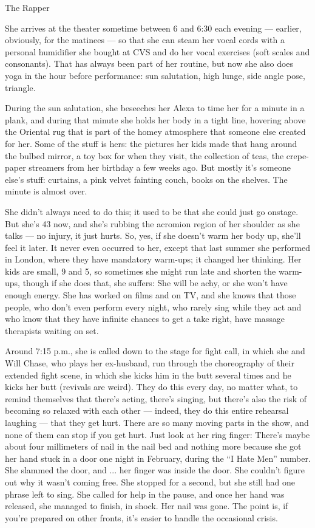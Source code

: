 \href{https://www.nytimes3xbfgragh.onion/interactive/2019/05/30/magazine/princess-nokia-new-york.html}{}

The Rapper

She arrives at the theater sometime between 6 and 6:30 each evening ---
earlier, obviously, for the matinees --- so that she can steam her vocal
cords with a personal humidifier she bought at CVS and do her vocal
exercises (soft scales and consonants). That has always been part of her
routine, but now she also does yoga in the hour before performance: sun
salutation, high lunge, side angle pose, triangle.

During the sun salutation, she beseeches her Alexa to time her for a
minute in a plank, and during that minute she holds her body in a tight
line, hovering above the Oriental rug that is part of the homey
atmosphere that someone else created for her. Some of the stuff is hers:
the pictures her kids made that hang around the bulbed mirror, a toy box
for when they visit, the collection of teas, the crepe-paper streamers
from her birthday a few weeks ago. But mostly it's someone else's stuff:
curtains, a pink velvet fainting couch, books on the shelves. The minute
is almost over.

She didn't always need to do this; it used to be that she could just go
onstage. But she's 43 now, and she's rubbing the acromion region of her
shoulder as she talks --- no injury, it just hurts. So, yes, if she
doesn't warm her body up, she'll feel it later. It never even occurred
to her, except that last summer she performed in London, where they have
mandatory warm-ups; it changed her thinking. Her kids are small, 9 and
5, so sometimes she might run late and shorten the warm-ups, though if
she does that, she suffers: She will be achy, or she won't have enough
energy. She has worked on films and on TV, and she knows that those
people, who don't even perform every night, who rarely sing while they
act and who know that they have infinite chances to get a take right,
have massage therapists waiting on set.

Around 7:15 p.m., she is called down to the stage for fight call, in
which she and Will Chase, who plays her ex-husband, run through the
choreography of their extended fight scene, in which she kicks him in
the butt several times and he kicks her butt (revivals are weird). They
do this every day, no matter what, to remind themselves that there's
acting, there's singing, but there's also the risk of becoming so
relaxed with each other --- indeed, they do this entire rehearsal
laughing --- that they get hurt. There are so many moving parts in the
show, and none of them can stop if you get hurt. Just look at her ring
finger: There's maybe about four millimeters of nail in the nail bed and
nothing more because she got her hand stuck in a door one night in
February, during the ``I Hate Men'' number. She slammed the door, and
... her finger was inside the door. She couldn't figure out why it
wasn't coming free. She stopped for a second, but she still had one
phrase left to sing. She called for help in the pause, and once her hand
was released, she managed to finish, in shock. Her nail was gone. The
point is, if you're prepared on other fronts, it's easier to handle the
occasional crisis.

